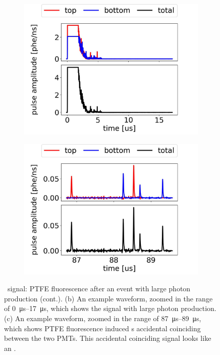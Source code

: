 \begin{figure}\ContinuedFloat
	\centering
	\begin{subfigure}[b]{0.7\textwidth}
		\centering
		\includegraphics[width=\figurewidth,clip,trim={0 0 0 0}]{Figures/GasTest/exampleWaveforms/proc64767PTFEFluo2P1.jpg}
		\caption{}
		\label{fig:ptfe fluo c}
	\end{subfigure}
	\par\bigskip
	\begin{subfigure}[b]{0.7\textwidth}
		\centering
		\includegraphics[width=\figurewidth,clip,trim={0 0 0 0}]{Figures/GasTest/exampleWaveforms/proc64767PTFEFluo2P2.jpg}
		\caption{}
		\label{fig:ptfe fluo d}
	\end{subfigure}
	\caption[\gtest\ signal: PTFE fluorescence after an event with large photon production (cont.).]{\gtest\ signal: PTFE fluorescence after an event with large photon production (cont.). (b) An example waveform, zoomed in the range of \SIrange{0}{17}{\us}, which shows the signal with large photon production.  (c) An example waveform, zoomed in the range of \SIrange{87}{89}{\us}, which shows PTFE fluorescence induced \sphe s accidental coinciding between the two PMTs. This accidental coinciding signal looks like an \ees .}
	\label{fig:ptfe fluo cont}
\end{figure}

